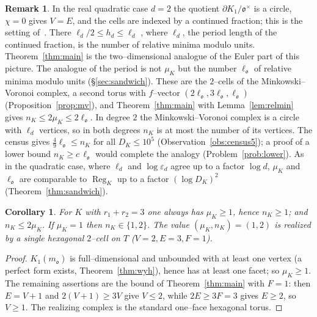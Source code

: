 \documentclass[11pt,reqno]{amsart}
\theoremstyle{plain}
\newtheorem{corollary}[theorem]{Corollary}
\theoremstyle{definition}
\newtheorem{remark}[theorem]{Remark}
\newcommand{\Reg}{\operatorname{Reg}}
\newcommand{\Ok}{\mathfrak{o}}
\newcommand{\bdy}{\partial}
\newcommand{\nK}{n_K}
\newcommand{\muK}{\mu_K}
\begin{document}
\begin{remark}\label{rem:yasaki}
In the real quadratic case $d=2$ the quotient $\bdy K_1/\Ok^\times$ is a circle, $\chi=0$ gives $V=E$, and
the cells are indexed by a continued fraction; this is the setting of~\cite{Yasaki}. There
$\ell_d/2\le h_d\le\ell_d$ \cite[Thm.~5.1]{Yasaki}, where $\ell_d$, the period length of the continued
fraction, is the number of relative minima modulo units. Theorem~\ref{thm:main} is the two--dimensional
analogue of the Euler part of this picture. The analogue of the period is not $\muK$ but the number
$\ell_\Ok$ of relative minima modulo units (\S\ref{sec:sandwich}). These are the $2$--cells of the
Minkowski--Voronoi complex, a second torus with $f$--vector $(2\ell_\Ok,3\ell_\Ok,\ell_\Ok)$
(Proposition~\ref{prop:mv}), and Theorem~\ref{thm:main} with Lemma~\ref{lem:relmin} gives
$\nK\le2\muK\le2\ell_\Ok$. In degree $2$ the Minkowski--Voronoi complex is a circle with $\ell_d$ vertices,
so in both degrees $\nK$ is at most the number of its vertices. The census gives
$\tfrac49\ell_\Ok\le\nK$ for all $D_K\le10^5$ (Observation~\ref{obs:census5}); a proof of a lower bound
$\nK\ge c\,\ell_\Ok$ would complete the analogy (Problem~\ref{prob:lower}). As in the quadratic case,
where $\ell_d$ and $\log\varepsilon_d$ agree up to a factor $\log d$, $\muK$ and $\ell_\Ok$ are comparable
to $\Reg_K$ up to a factor $(\log D_K)^2$ (Theorem~\ref{thm:sandwich}).
\end{remark}

\begin{corollary}\label{cor:floor}
For $K$ with $r_1+r_2=3$ one always has $\muK\ge1$, hence $\nK\ge1$; and $\nK\le 2\muK$. If
$\muK=1$ then $\nK\in\{1,2\}$. The value $(\muK,\nK)=(1,2)$ is realized by a single hexagonal $2$--cell on
$T$ \textup{(}$V=2,E=3,F=1$\textup{)}.
\end{corollary}

\begin{proof}
$K_1(m_\Ok)$ is full--dimensional and unbounded with at least one vertex (a perfect form exists,
Theorem~\ref{thm:wyh}), hence has at least one facet; so $\muK\ge1$. The remaining assertions are the bound
of Theorem~\ref{thm:main} with $F=1$: then $E=V+1$ and $2(V+1)\ge3V$ give $V\le2$, while $2E\ge3F=3$ gives
$E\ge2$, so $V\ge1$. The realizing complex is the standard one--face hexagonal torus.
\end{proof}
\end{document}
